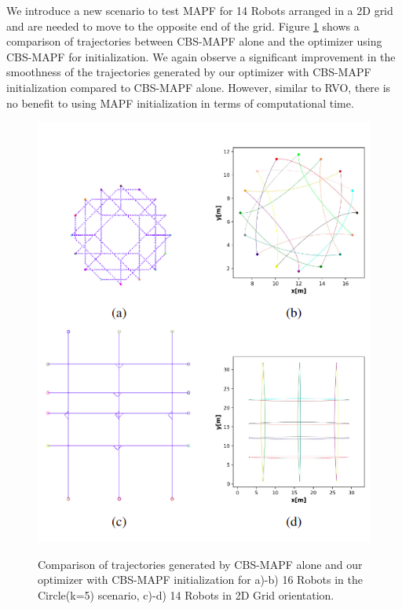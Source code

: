 We introduce a new scenario to test MAPF for 14 Robots arranged in a 2D grid and are needed to move to the opposite end of the grid. Figure \ref{fig:MAPF+opti_grid} shows a comparison of trajectories between CBS-MAPF alone and the optimizer using CBS-MAPF for initialization. We again observe a significant improvement in the smoothness of the trajectories generated by our optimizer with CBS-MAPF initialization compared to CBS-MAPF alone. However, similar to RVO, there is no benefit to using MAPF initialization in terms of computational time. 

\begin{figure}[H]
    \centering
    {\includegraphics[scale=0.6]{figures/appendix/mapf_init.png}} 
    \caption[Appendix: Trajectories using MAPF + multirobot optimizer]{Comparison of trajectories generated by CBS-MAPF alone and our optimizer with CBS-MAPF initialization for a)-b) 16 Robots in the Circle(k=5) scenario, c)-d) 14 Robots in 2D Grid orientation.}
    \label{fig:MAPF+opti_grid}
\end{figure}